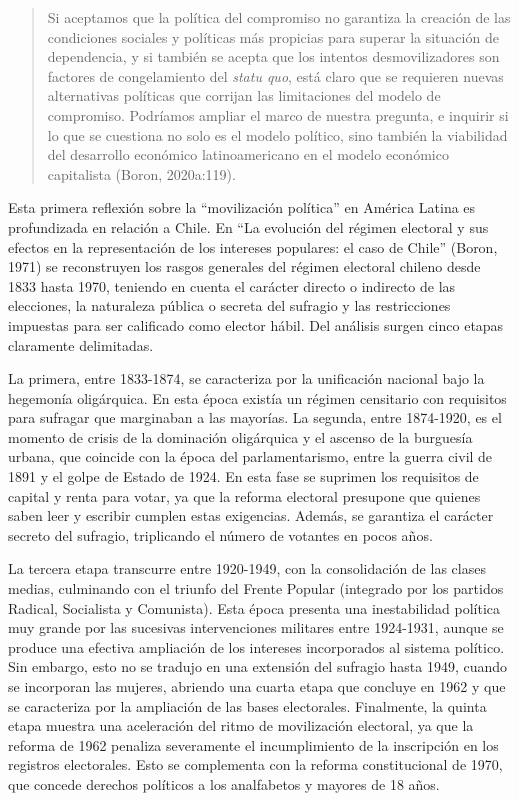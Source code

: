 \begin{quote}
Si aceptamos que la política del compromiso no garantiza la creación de las condiciones sociales y políticas más propicias para superar la situación de dependencia, y si también se acepta que los intentos desmovilizadores son factores de congelamiento del \emph{statu quo}, está claro que se requieren nuevas alternativas políticas que corrijan las limitaciones del modelo de compromiso. Podríamos ampliar el marco de nuestra pregunta, e inquirir si lo que se cuestiona no solo es el modelo político, sino también la viabilidad del desarrollo económico latinoamericano en el modelo económico capitalista (Boron, 2020a:119).
\end{quote}

Esta primera reflexión sobre la ``movilización política'' en América Latina es profundizada en relación a Chile. En ``La evolución del régimen electoral y sus efectos en la representación de los intereses populares: el caso de Chile'' (Boron, 1971) se reconstruyen los rasgos generales del régimen electoral chileno desde 1833 hasta 1970, teniendo en cuenta el carácter directo o indirecto de las elecciones, la naturaleza pública o secreta del sufragio y las restricciones impuestas para ser calificado como elector hábil. Del análisis surgen cinco etapas claramente delimitadas.

La primera, entre 1833-1874, se caracteriza por la unificación nacional bajo la hegemonía oligárquica. En esta época existía un régimen censitario con requisitos para sufragar que marginaban a las mayorías. La segunda, entre 1874-1920, es el momento de crisis de la dominación oligárquica y el ascenso de la burguesía urbana, que coincide con la época del parlamentarismo, entre la guerra civil de 1891 y el golpe de Estado de 1924. En esta fase se suprimen los requisitos de capital y renta para votar, ya que la reforma electoral presupone que quienes saben leer y escribir cumplen estas exigencias. Además, se garantiza el carácter secreto del sufragio, triplicando el número de votantes en pocos años.

La tercera etapa transcurre entre 1920-1949, con la consolidación de las clases medias, culminando con el triunfo del Frente Popular (integrado por los partidos Radical, Socialista y Comunista). Esta época presenta una inestabilidad política muy grande por las sucesivas intervenciones militares entre 1924-1931, aunque se produce una efectiva ampliación de los intereses incorporados al sistema político. Sin embargo, esto no se tradujo en una extensión del sufragio hasta 1949, cuando se incorporan las mujeres, abriendo una cuarta etapa que concluye en 1962 y que se caracteriza por la ampliación de las bases electorales. Finalmente, la quinta etapa muestra una aceleración del ritmo de movilización electoral, ya que la reforma de 1962 penaliza severamente el incumplimiento de la inscripción en los registros electorales. Esto se complementa con la reforma constitucional de 1970, que concede derechos políticos a los analfabetos y mayores de 18 años.

